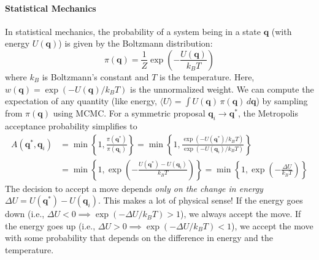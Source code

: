 \paragraph*{Statistical Mechanics}
In statistical mechanics, the probability of a system being in a state $\mathbf{q}$ (with energy $U(\mathbf{q})$) is given by the Boltzmann distribution:
\begin{equation}
    \pi(\mathbf{q}) = \frac{1}{Z} \exp\left(-\frac{U(\mathbf{q})}{k_B T}\right)
\end{equation}
where $k_B$ is Boltzmann's constant and $T$ is the temperature. Here, $w(\mathbf{q}) = \exp(-U(\mathbf{q})/k_B T)$ is the unnormalized weight. We can compute the expectation of any quantity (like energy, $\langle U \rangle = \int U(\mathbf{q})\,\pi(\mathbf{q})\,d\mathbf{q}$) by sampling from $\pi(\mathbf{q})$ using MCMC.
For a symmetric proposal $\mathbf{q}_i \to \mathbf{q}^*$, the Metropolis acceptance probability simplifies to
\begin{align}
    A(\mathbf{q}^*, \mathbf{q}_i) &= \min \left\{ 1, \frac{\pi(\mathbf{q}^*)}{\pi(\mathbf{q}_i)} \right\}
    = \min \left\{ 1, \frac{\exp(-U(\mathbf{q}^*)/k_B T)}{\exp(-U(\mathbf{q}_i)/k_B T)} \right\} \\
    &= \min \left\{ 1, \exp\left(-\frac{U(\mathbf{q}^*) - U(\mathbf{q}_i)}{k_B T}\right) \right\} = \min \left\{ 1, \exp\left(-\frac{\Delta U}{k_B T}\right) \right\}
\end{align}
The decision to accept a move depends \emph{only on the change in energy} $\Delta U = U(\mathbf{q}^*) - U(\mathbf{q}_i)$. This makes a lot of physical sense! If the energy goes down (i.e., $\Delta U < 0 \implies \exp(-\Delta U/k_B T) > 1$), we always accept the move. If the energy goes up (i.e., $\Delta U > 0 \implies \exp(-\Delta U/k_B T) < 1$), we accept the move with some probability that depends on the difference in energy and the temperature.

